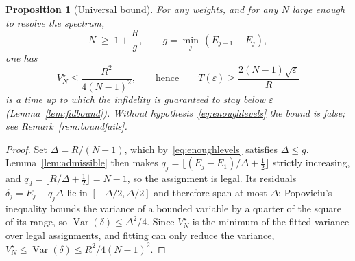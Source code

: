 \documentclass[aps,prd,onecolumn,notitlepage,10pt,amsmath,amssymb,amsfonts,nofootinbib]{revtex4-2}
\newtheorem{proposition}{Proposition}
\theoremstyle{definition}
\theoremstyle{remark}
\begin{document}
\begin{proposition}[Universal bound]
\label{prop:universalb}
For any weights, and for any $N$ large enough to resolve the spectrum,
\begin{equation}
  N\;\ge\;1+\frac{R}{g},\qquad g=\min_j\,(E_{j+1}-E_j),
  \label{eq:enoughlevels}
\end{equation}
one has
\begin{equation}
  V^\star_N\le\frac{R^2}{4(N-1)^2},
  \qquad\text{hence}\qquad
  T(\varepsilon)\ge\frac{2(N-1)\sqrt{\varepsilon}}{R}
  \label{eq:universal}
\end{equation}
is a time up to which the infidelity is guaranteed to stay below $\varepsilon$ (Lemma~\ref{lem:fidbound}). Without hypothesis~\eqref{eq:enoughlevels} the bound is false; see Remark~\ref{rem:boundfails}.
\end{proposition}
\begin{proof}
Set $\Delta=R/(N-1)$, which by~\eqref{eq:enoughlevels} satisfies $\Delta\le g$. Lemma~\ref{lem:admissible} then makes $q_j=\lfloor(E_j-E_1)/\Delta+\tfrac12\rfloor$ strictly increasing, and $q_d=\lfloor R/\Delta+\tfrac12\rfloor=N-1$, so the assignment is legal. Its residuals $\delta_j=E_j-q_j\Delta$ lie in $[-\Delta/2,\Delta/2]$ and therefore span at most $\Delta$; Popoviciu's inequality bounds the variance of a bounded variable by a quarter of the square of its range, so $\operatorname{Var}(\delta)\le\Delta^2/4$. Since $V^\star_N$ is the minimum of the fitted variance over legal assignments, and fitting can only reduce the variance, $V^\star_N\le\operatorname{Var}(\delta)\le R^2/4(N-1)^2$.
\end{proof}
\end{document}

